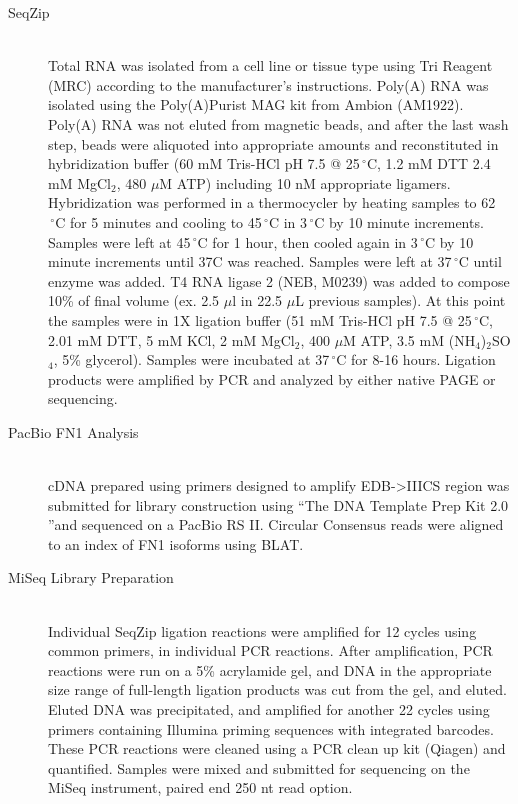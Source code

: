 \begin{description}
		\item[SeqZip] \hfill \\
		Total RNA was isolated from a cell line or tissue type using Tri Reagent (MRC) according to the manufacturer's instructions. Poly(A) RNA was isolated using the Poly(A)Purist MAG kit from Ambion (AM1922). Poly(A) RNA was not eluted from magnetic beads, and after the last wash step, beads were aliquoted into appropriate amounts and reconstituted in hybridization buffer (60 mM Tris-HCl pH 7.5 @ 25$\,^{\circ}\mathrm{C}$, 1.2 mM DTT 2.4 mM MgCl$_{2}$, 480 $\mu$M ATP) including 10 nM appropriate ligamers. Hybridization was performed in a thermocycler by heating samples to 62$\,^{\circ}\mathrm{C}$ for 5 minutes and cooling to 45$\,^{\circ}\mathrm{C}$ in 3$\,^{\circ}\mathrm{C}$ by 10 minute increments. Samples were left at 45$\,^{\circ}\mathrm{C}$ for 1 hour, then cooled again in 3$\,^{\circ}\mathrm{C}$ by 10 minute increments until 37C was reached. Samples were left at 37$\,^{\circ}\mathrm{C}$ until enzyme was added. T4 RNA ligase 2 (NEB, M0239) was added to compose 10\% of final volume (ex. 2.5 $\mu$l in 22.5 $\mu$L previous samples). At this point the samples were in 1X ligation buffer (51 mM Tris-HCl pH 7.5 @ 25$\,^{\circ}\mathrm{C}$, 2.01 mM DTT, 5 mM KCl, 2 mM MgCl$_{2}$, 400 $\mu$M ATP, 3.5 mM (NH$_{4}$)$_{2}$SO$_{4}$, 5\% glycerol). Samples were incubated at 37$\,^{\circ}\mathrm{C}$ for 8-16 hours. Ligation products were amplified by PCR and analyzed by either native PAGE or sequencing.

		\item[PacBio FN1 Analysis] \hfill \\
		cDNA prepared using primers designed to amplify EDB->IIICS region was submitted for library construction using ``The DNA Template Prep Kit 2.0 ''and sequenced on a PacBio RS II. Circular Consensus reads were aligned to an index of FN1 isoforms using BLAT. 

		\item[MiSeq Library Preparation] \hfill \\
		Individual SeqZip ligation reactions were amplified for 12 cycles using common primers, in individual PCR reactions. After amplification, PCR reactions were run on a 5\% acrylamide gel, and DNA in the appropriate size range of full-length ligation products was cut from the gel, and eluted. Eluted DNA was precipitated, and amplified for another 22 cycles using primers containing Illumina priming sequences with integrated barcodes. These PCR reactions were cleaned using a PCR clean up kit (Qiagen) and quantified. Samples were mixed and submitted for sequencing on the MiSeq instrument, paired end 250 nt read option.


\end{description}
